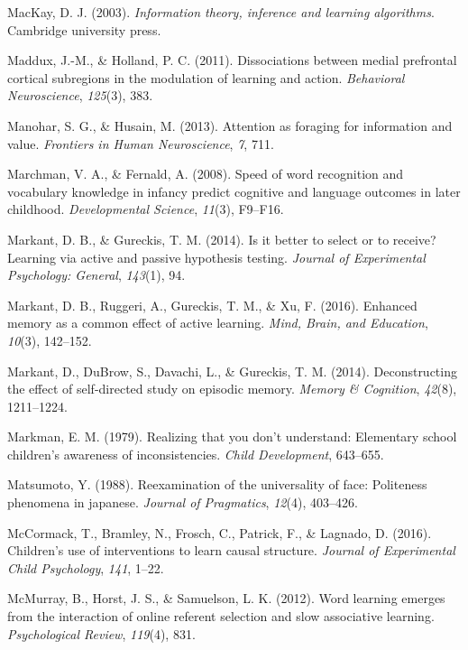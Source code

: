 \documentclass[oneside]{report}
\begin{document}
\hypertarget{ref-mackay2003information}{}
MacKay, D. J. (2003). \emph{Information theory, inference and learning
algorithms}. Cambridge university press.

\hypertarget{ref-maddux2011dissociations}{}
Maddux, J.-M., \& Holland, P. C. (2011). Dissociations between medial
prefrontal cortical subregions in the modulation of learning and action.
\emph{Behavioral Neuroscience}, \emph{125}(3), 383.

\hypertarget{ref-manohar2013attention}{}
Manohar, S. G., \& Husain, M. (2013). Attention as foraging for
information and value. \emph{Frontiers in Human Neuroscience}, \emph{7},
711.

\hypertarget{ref-marchman2008speed}{}
Marchman, V. A., \& Fernald, A. (2008). Speed of word recognition and
vocabulary knowledge in infancy predict cognitive and language outcomes
in later childhood. \emph{Developmental Science}, \emph{11}(3), F9--F16.

\hypertarget{ref-markant2014better}{}
Markant, D. B., \& Gureckis, T. M. (2014). Is it better to select or to
receive? Learning via active and passive hypothesis testing.
\emph{Journal of Experimental Psychology: General}, \emph{143}(1), 94.

\hypertarget{ref-markant2016enhanced}{}
Markant, D. B., Ruggeri, A., Gureckis, T. M., \& Xu, F. (2016). Enhanced
memory as a common effect of active learning. \emph{Mind, Brain, and
Education}, \emph{10}(3), 142--152.

\hypertarget{ref-markant2014deconstructing}{}
Markant, D., DuBrow, S., Davachi, L., \& Gureckis, T. M. (2014).
Deconstructing the effect of self-directed study on episodic memory.
\emph{Memory \& Cognition}, \emph{42}(8), 1211--1224.

\hypertarget{ref-markman1979realizing}{}
Markman, E. M. (1979). Realizing that you don't understand: Elementary
school children's awareness of inconsistencies. \emph{Child
Development}, 643--655.

\hypertarget{ref-matsumoto1988}{}
Matsumoto, Y. (1988). Reexamination of the universality of face:
Politeness phenomena in japanese. \emph{Journal of Pragmatics},
\emph{12}(4), 403--426.

\hypertarget{ref-mccormack2016children}{}
McCormack, T., Bramley, N., Frosch, C., Patrick, F., \& Lagnado, D.
(2016). Children's use of interventions to learn causal structure.
\emph{Journal of Experimental Child Psychology}, \emph{141}, 1--22.

\hypertarget{ref-mcmurray2012word}{}
McMurray, B., Horst, J. S., \& Samuelson, L. K. (2012). Word learning
emerges from the interaction of online referent selection and slow
associative learning. \emph{Psychological Review}, \emph{119}(4), 831.
\end{document}
